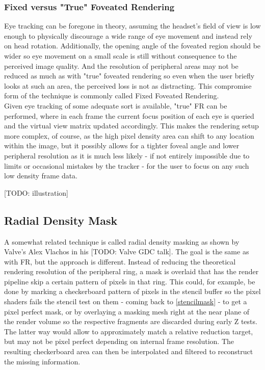 \subsubsection{Fixed versus "True" Foveated Rendering}
Eye tracking can be foregone in theory, assuming the headset's field of view is low enough to physically discourage a wide range of eye movement and instead rely on head rotation. Additionally, the opening angle of the foveated region should be wider so eye movement on a small scale is still without consequence to the perceived image quality. And the resolution of peripheral areas may not be reduced as much as with "true" foveated rendering so even when the user briefly looks at such an area, the perceived loss is not as distracting. This compromise form of the technique is commonly called Fixed Foveated Rendering. \\
Given eye tracking of some adequate sort is available, "true" FR can be performed, where in each frame the current focus position of each eye is queried and the virtual view matrix updated accordingly. This makes the rendering setup more complex, of course, as the high pixel density area can shift to any location within the image, but it possibly allows for a tighter foveal angle and lower peripheral resolution as it is much less likely - if not entirely impossible due to limits or occasional mistakes by the tracker - for the user to focus on any such low density frame data. 

[TODO: illustration]

\subsection{Radial Density Mask}
A somewhat related technique is called radial density masking as shown by Valve's Alex Vlachos in his [TODO: Valve GDC talk]. The goal is the same as with FR, but the approach is different. Instead of reducing the theoretical rendering resolution of the peripheral ring, a mask is overlaid that has the render pipeline skip a certain pattern of pixels in that ring. This could, for example, be done by marking a checkerboard pattern of pixels in the stencil buffer so the pixel shaders fails the stencil test on them - coming back to \autoref{stencilmask} - to get a pixel perfect mask, or by overlaying a masking mesh right at the near plane of the render volume so the respective fragments are discarded during early Z tests. The latter way would allow to approximately match a relative reduction target, but may not be pixel perfect depending on internal frame resolution. 
The resulting checkerboard area can then be interpolated and filtered to reconstruct the missing information. 

